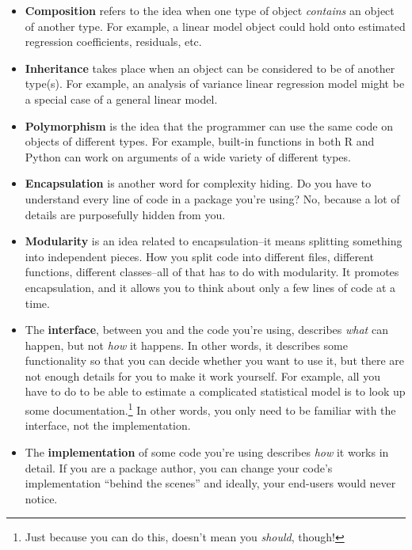 \documentclass[12pt,krantz2]{krantz}
\begin{document}
\begin{itemize}
\item
  \textbf{Composition} refers to the idea when one type of object \emph{contains} an object of another type. For example, a linear model object could hold onto estimated regression coefficients, residuals, etc.
\item
  \textbf{Inheritance} takes place when an object can be considered to be of another type(s). For example, an analysis of variance linear regression model might be a special case of a general linear model.
\item
  \textbf{Polymorphism} is the idea that the programmer can use the same code on objects of different types. For example, built-in functions in both R and Python can work on arguments of a wide variety of different types.
\item
  \textbf{Encapsulation} is another word for complexity hiding. Do you have to understand every line of code in a package you're using? No, because a lot of details are purposefully hidden from you.
\item
  \textbf{Modularity} is an idea related to encapsulation--it means splitting something into independent pieces. How you split code into different files, different functions, different classes--all of that has to do with modularity. It promotes encapsulation, and it allows you to think about only a few lines of code at a time.
\item
  The \textbf{interface}, between you and the code you're using, describes \emph{what} can happen, but not \emph{how} it happens. In other words, it describes some functionality so that you can decide whether you want to use it, but there are not enough details for you to make it work yourself. For example, all you have to do to be able to estimate a complicated statistical model is to look up some documentation.\footnote{Just because you can do this, doesn't mean you \emph{should}, though!} In other words, you only need to be familiar with the interface, not the implementation.
\item
  The \textbf{implementation} of some code you're using describes \emph{how} it works in detail. If you are a package author, you can change your code's implementation ``behind the scenes'' and ideally, your end-users would never notice.
\end{itemize}
\end{document}
